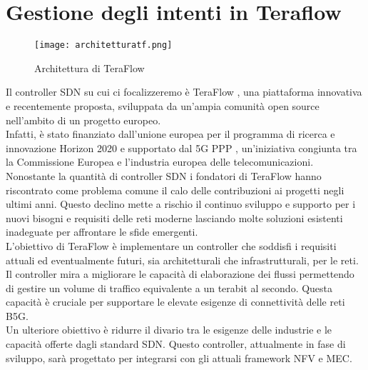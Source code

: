 \chapter{Gestione degli intenti in Teraflow}
\label{cap:teraflow}
\begin{figure}[h]
    \centering
   \texttt{[image: architetturatf.png]}
    \caption{Architettura di TeraFlow \cite{archtfs}}
    \label{fig:tfs}
\end{figure}
Il controller SDN su cui ci focalizzeremo è TeraFlow \cite{TeraFlow}, una piattaforma innovativa e recentemente proposta, sviluppata da un'ampia comunità open source nell'ambito di un progetto europeo. 
\\Infatti, è stato finanziato dall'unione europea per il programma di ricerca e innovazione Horizon 2020 \cite{Horizon} e supportato dal 5G PPP \cite{5GPPP}, un'iniziativa congiunta tra la Commissione Europea e l'industria europea delle telecomunicazioni.
Nonostante la quantità di controller SDN i fondatori di TeraFlow hanno riscontrato come problema comune il calo delle contribuzioni ai progetti negli ultimi anni. 
Questo declino mette a rischio il continuo sviluppo e supporto per i nuovi bisogni e requisiti delle reti moderne lasciando molte soluzioni esistenti inadeguate per affrontare le sfide emergenti.
\\L'obiettivo di TeraFlow è implementare un controller che soddisfi i requisiti attuali ed eventualmente futuri, sia architetturali che infrastrutturali, per le reti.
Il controller mira a migliorare le capacità di elaborazione dei flussi permettendo di gestire un volume di traffico equivalente a un terabit al secondo. 
Questa capacità è cruciale per supportare le elevate esigenze di connettività delle reti B5G.
\\Un ulteriore obiettivo è ridurre il divario tra le esigenze delle industrie e le capacità offerte dagli standard SDN.
Questo controller, attualmente in fase di sviluppo, sarà progettato per integrarsi con gli attuali framework NFV e MEC.
